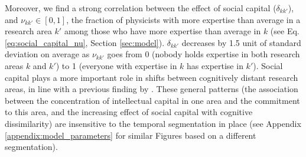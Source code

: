 \documentclass{article}
\begin{document}
Moreover, we find a strong correlation between the effect of social capital ($\delta_{kk'}$), and $\nu_{kk'}\in[0,1]$, the fraction of physicists with more expertise than average in a research area $k'$ among those who have more expertise than average in $k$ (see Eq. \eqref{eq:social_capital_nu}, Section \ref{sec:model}). $\delta_{kk'}$ decreases by 1.5 unit of standard deviation on average as $\nu_{kk'}$ goes from 0 (nobody holds expertise in both research areas $k$ and $k'$) to 1 (everyone with expertise in $k$ has expertise in $k'$). Social capital plays a more important role in shifts between cognitively distant research areas, in line with a previous finding by \citeauthor{Tripodi2020} \citealt{Tripodi2020}. These general patterns (the association between the concentration of intellectual capital in one area and the commitment to this area, and the increasing effect of social capital with cognitive dissimilarity) are insensitive to the temporal segmentation in place (see Appendix \ref{appendix:model_parameters} for similar Figures based on a different segmentation).

\end{document}
